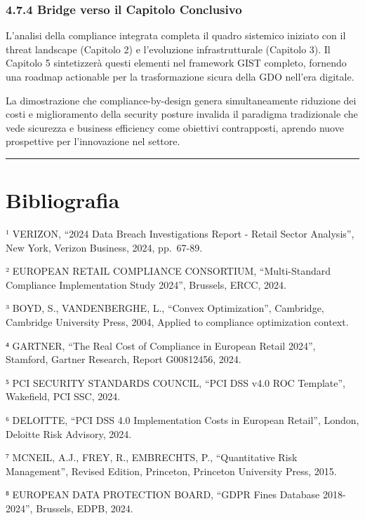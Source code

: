 \documentclass[12pt,a4paper,oneside]{book}
\begin{document}
\subsubsection{4.7.4 Bridge verso il Capitolo
Conclusivo}\label{bridge-verso-il-capitolo-conclusivo}

L'analisi della compliance integrata completa il quadro sistemico
iniziato con il threat landscape (Capitolo 2) e l'evoluzione
infrastrutturale (Capitolo 3). Il Capitolo 5 sintetizzerà questi
elementi nel framework GIST completo, fornendo una roadmap actionable
per la trasformazione sicura della GDO nell'era digitale.

La dimostrazione che compliance-by-design genera simultaneamente
riduzione dei costi e miglioramento della security posture invalida il
paradigma tradizionale che vede sicurezza e business efficiency come
obiettivi contrapposti, aprendo nuove prospettive per l'innovazione nel
settore.

\begin{center}\rule{0.5\linewidth}{0.5pt}\end{center}

\section{Bibliografia}\label{bibliografia-1}

¹ VERIZON, ``2024 Data Breach Investigations Report - Retail Sector
Analysis'', New York, Verizon Business, 2024, pp.~67-89.

² EUROPEAN RETAIL COMPLIANCE CONSORTIUM, ``Multi-Standard Compliance
Implementation Study 2024'', Brussels, ERCC, 2024.

³ BOYD, S., VANDENBERGHE, L., ``Convex Optimization'', Cambridge,
Cambridge University Press, 2004, Applied to compliance optimization
context.

⁴ GARTNER, ``The Real Cost of Compliance in European Retail 2024'',
Stamford, Gartner Research, Report G00812456, 2024.

⁵ PCI SECURITY STANDARDS COUNCIL, ``PCI DSS v4.0 ROC Template'',
Wakefield, PCI SSC, 2024.

⁶ DELOITTE, ``PCI DSS 4.0 Implementation Costs in European Retail'',
London, Deloitte Risk Advisory, 2024.

⁷ MCNEIL, A.J., FREY, R., EMBRECHTS, P., ``Quantitative Risk
Management'', Revised Edition, Princeton, Princeton University Press,
2015.

⁸ EUROPEAN DATA PROTECTION BOARD, ``GDPR Fines Database 2018-2024'',
Brussels, EDPB, 2024.
\end{document}
